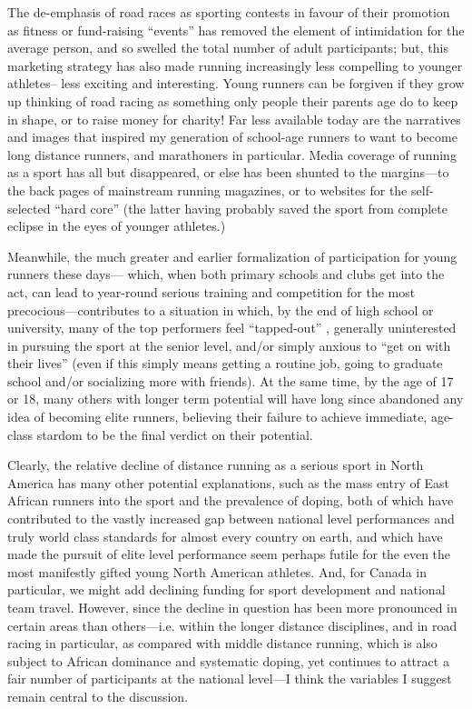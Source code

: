 The de-emphasis of road races as sporting contests in favour of their promotion as fitness or fund-raising “events” has removed the element of intimidation for the average person, and so swelled the total number of adult participants; but, this marketing strategy has also made running increasingly less compelling to younger athletes-- less exciting and interesting. Young runners can be forgiven if they grow up thinking of road racing as something only people their parents age do to keep in shape, or to raise money for charity! Far less available today are the narratives and images that inspired my generation of school-age runners to want to become long distance runners, and marathoners in particular. Media coverage of running as a sport has all but disappeared, or else has been shunted to the margins—to the back pages of mainstream running magazines, or to websites for the self-selected “hard core” (the latter having probably saved the sport from complete eclipse in the eyes of younger athletes.)

Meanwhile, the much greater and earlier formalization of participation for young runners these days— which, when both primary schools and clubs get into the act, can lead to year-round serious training and competition for the most precocious—contributes to a situation in which, by the end of high school or university, many of the top performers feel “tapped-out” , generally uninterested in pursuing the sport at the senior level, and/or simply anxious to “get on with their lives” (even if this simply means getting a routine job, going to graduate school and/or socializing more with friends). At the same time, by the age of 17 or 18, many others with longer term potential will have long since abandoned any idea of becoming elite runners, believing their failure to achieve immediate, age-class stardom to be the final verdict on their potential.

Clearly, the relative decline of distance running as a serious sport in North America has many other potential explanations, such as the mass entry of East African runners into the sport and the prevalence of doping, both of which have contributed to the vastly increased gap between national level performances and truly world class standards for almost every country on earth, and which have made the pursuit of elite level performance seem perhaps futile for the even the most manifestly gifted young North American athletes. And, for Canada in particular, we might add declining funding for sport development and national team travel. However, since the decline in question has been more pronounced in certain areas than others—i.e. within the longer distance disciplines, and in road racing in particular, as compared with middle distance running, which is also subject to African dominance and systematic doping, yet continues to attract a fair number of participants at the national level—I think the variables I suggest remain central to the discussion.


